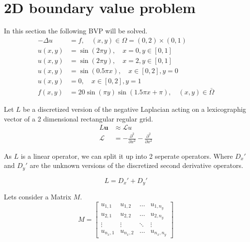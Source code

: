 \documentclass{article}
\begin{document}
\section{2D boundary value problem}
In this section the following BVP will be solved.
\begin{equation}
\begin{aligned}-\Delta u &=f, \quad(x, y) \in \Omega=(0,2) \times(0,1) \\ u(x, y) &=\sin (2 \pi y), \quad x=0, y \in[0,1] \\ u(x, y) &=\sin (2 \pi y), \quad x=2, y \in[0,1] \\ u(x, y) &=\sin (0.5 \pi x), \quad x \in[0,2], y=0 \\ u(x, y) &=0, \quad x \in[0,2], y=1 \\ f(x, y) &=20 \sin (\pi y) \sin (1.5 \pi x+\pi), \quad(x, y) \in \bar{\Omega} \end{aligned}
\end{equation}

    
Let $L$ be a discretized version of the negative Laplacian acting on a lexicographig vector of a 2 dimensional rectangular regular grid.
\begin{align}
    L\mathbf{u} &\approx \mathcal{L} u\\
    \mathcal{L} &= -\frac{\partial^2}{\partial x^2} - \frac{\partial^2}{\partial x^2}
\end{align}

As $L$ is a linear operator, we can split it up into 2 seperate operators. Where $D_x'$ and $D_y'$ are the unknown versions of the discretized second derivative operators.

\begin{equation}
    L = D_x' + D_y'
\end{equation}

Lets consider a Matrix $M$.
\begin{equation}
    M = \begin{bmatrix}
        u_{1,1} & u_{1,2} & \dots & u_{1,n_y} \\
        u_{2,1} & u_{2,2} & \dots & u_{2,n_y} \\
        \vdots & \vdots & \ddots & \vdots \\
        u_{n_x,1} & u_{n_x,2} & \dots & u_{n_x,n_y}
    \end{bmatrix}
\end{equation}
\end{document}
